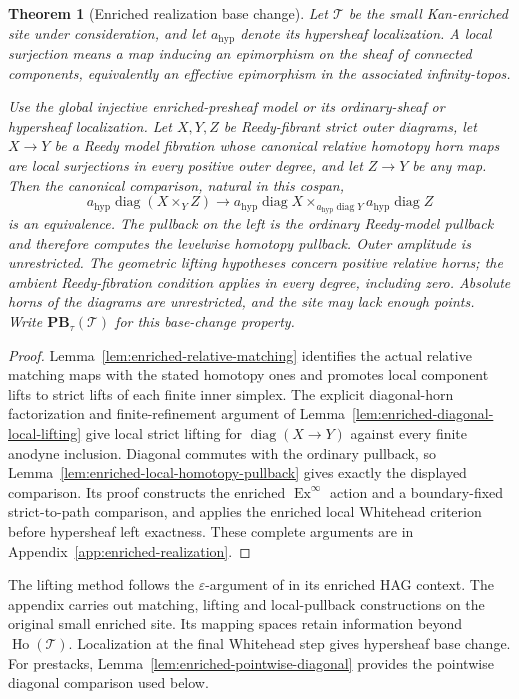 \documentclass[12pt]{amsart}
\newtheorem{thm}{Theorem}[section]
\theoremstyle{definition}
\theoremstyle{remark}
\numberwithin{equation}{section}
\DeclareMathOperator{\Ex}{Ex}
\begin{document}
\begin{thm}[Enriched realization base change]
Let $\mathcal T$ be the small Kan-enriched site under
consideration, and let $a_{\mathrm{hyp}}$ denote its
hypersheaf localization.
\label{lem:derived-hypercomplete-base-change}
A \emph{local surjection} means
a map inducing an epimorphism on the sheaf of connected
components, equivalently an effective epimorphism in the
associated infinity-topos.

Use the global injective enriched-presheaf model or its
ordinary-sheaf or hypersheaf localization. Let $X,Y,Z$
be Reedy-fibrant strict outer diagrams, let $X\to Y$ be
a Reedy model fibration whose canonical relative homotopy
horn maps are local surjections in every positive outer
degree, and let $Z\to Y$ be any map. Then the canonical
comparison, natural in this cospan,
\[
 a_{\mathrm{hyp}}\operatorname{diag}(X\times_Y Z)
 \longrightarrow
 a_{\mathrm{hyp}}\operatorname{diag}X
 \times_{a_{\mathrm{hyp}}\operatorname{diag}Y}
 a_{\mathrm{hyp}}\operatorname{diag}Z
\]
is an equivalence. The pullback on the left is the ordinary
Reedy-model pullback and therefore computes the levelwise
homotopy pullback. Outer amplitude is unrestricted.
The geometric lifting hypotheses concern positive relative
horns; the ambient Reedy-fibration condition applies in
every degree, including zero. Absolute horns of the
diagrams are unrestricted, and the site may lack enough
points. Write $\mathbf{PB}_\tau(\mathcal T)$ for this
base-change property.
\end{thm}

\begin{proof}
Lemma~\ref{lem:enriched-relative-matching} identifies the
actual relative matching maps with the stated homotopy
ones and promotes local component lifts to strict lifts
of each finite inner simplex. The explicit diagonal-horn
factorization and finite-refinement argument of
Lemma~\ref{lem:enriched-diagonal-local-lifting} give local
strict lifting for $\operatorname{diag}(X\to Y)$
against every finite anodyne inclusion.
Diagonal commutes with the ordinary pullback, so
Lemma~\ref{lem:enriched-local-homotopy-pullback} gives
exactly the displayed comparison. Its proof constructs
the enriched $\Ex^\infty$ action and a boundary-fixed
strict-to-path comparison, and applies the enriched
local Whitehead criterion before hypersheaf left
exactness. These complete arguments are in
Appendix~\ref{app:enriched-realization}.
\end{proof}

The lifting method follows the $\varepsilon$-argument of
\cite[Property~1.7(3) and Proposition~1.19]{Pridham2013}
in its enriched HAG context. The appendix carries out
matching, lifting and local-pullback constructions on
the original small enriched site. Its mapping spaces
retain information beyond $\operatorname{Ho}(\mathcal T)$.
Localization at the final Whitehead step gives
hypersheaf base change. For prestacks,
Lemma~\ref{lem:enriched-pointwise-diagonal} provides
the pointwise diagonal comparison used below.
\end{document}
